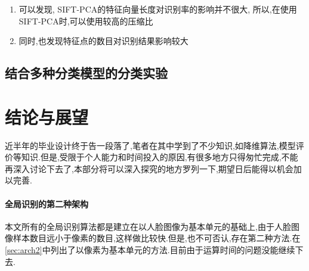 \begin{enumerate}
	\item 可以发现, SIFT-PCA的特征向量长度对识别率的影响并不很大, 所以,在使用SIFT-PCA时,可以使用较高的压缩比
	\item 同时,也发现特征点的数目对识别结果影响较大
\end{enumerate}

\subsection{结合多种分类模型的分类实验}



%

\section{结论与展望}

近半年的毕业设计终于告一段落了,笔者在其中学到了不少知识,如降维算法,模型评价等知识.但是,受限于个人能力和时间投入的原因,有很多地方只得匆忙完成,不能再深入讨论下去了,本部分将可以深入探究的地方罗列一下,期望日后能得以机会加以完善.

\paragraph{全局识别的第二种架构}
本文所有的全局识别算法都是建立在以人脸图像为基本单元的基础上,由于人脸图像样本数目远小于像素的数目,这样做比较快.但是,也不可否认,存在第二种方法.在\ref{sec:arch2}中列出了以像素为基本单元的方法.目前由于运算时间的问题没能继续下去.

